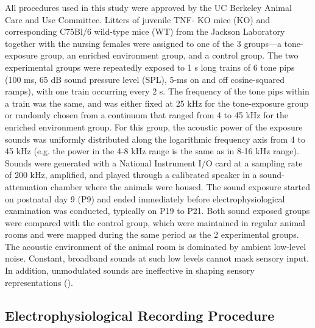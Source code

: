 All procedures used in this study were approved by the UC Berkeley Animal Care and Use Committee. Litters of juvenile TNF-\textalpha{} KO mice (KO) and corresponding C75Bl/6 wild-type mice (WT) from the Jackson Laboratory together with the nursing females were assigned to one of the 3 groups---a tone-exposure group, an enriched environment group, and a control group. The two experimental groups were repeatedly exposed to 1 s long trains of 6 tone pips (100 ms, 65 dB sound pressure level (SPL), 5-ms on and off cosine-squared ramps), with one train occurring every 2 s. The frequency of the tone pips within a train was the same, and was either fixed at 25 kHz for the tone-exposure group or randomly chosen from a continuum that ranged from 4 to 45 kHz for the enriched environment group. For this group, the acoustic power of the exposure sounds was uniformly distributed along the logarithmic frequency axis from 4 to 45 kHz (e.g. the power in the 4-8 kHz range is the same as in 8-16 kHz range). Sounds were generated with a National Instrument I/O card at a sampling rate of 200 kHz, amplified, and played through a calibrated speaker in a sound-attenuation chamber where the animals were housed. The sound exposure started on postnatal day 9 (P9) and ended immediately before electrophysiological examination was conducted, typically on P19 to P21. Both sound exposed groups were compared with the control group, which were maintained in regular animal rooms and were mapped during the same period as the 2 experimental groups. The acoustic environment of the animal room is dominated by ambient low-level noise. Constant, broadband sounds at such low levels cannot mask sensory input. In addition, unmodulated sounds are ineffective in shaping sensory representations (\cite{Kim2009}).

\subsection{Electrophysiological Recording Procedure}

